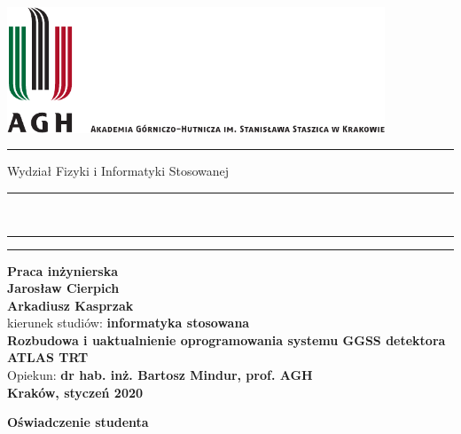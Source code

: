 \documentclass[11pt]{aghdpl}
\author{Jarosław Cierpich \and Arkadiusz Kasprzak}
\date{2019/2020}
\begin{document}

\thispagestyle{empty}

\includegraphics[height=37.5mm]{res/agh_nzw_a_pl_1w_wbr_cmyk.pdf}\\
\rule{30mm}{0pt}
{\Large\textsf{Wydział Fizyki i Informatyki Stosowanej}}\\
\rule{\textwidth}{3pt}\\
\rule[2.75ex]
{\textwidth}{1pt}%
\vspace{1em}\rule{30mm}{0pt}
\begin{center}
    {\bf\LARGE\textsf{Praca inżynierska}}\\
    \vspace{13ex}
    {\bf\Large\textsf{Jarosław Cierpich \\ Arkadiusz Kasprzak}}\\
    \vspace{3ex}
    {\sf \small kierunek studiów:} {\bf\small\textsf{informatyka stosowana}}\\
    \vspace{15ex}
    {\bf\huge\textsf{Rozbudowa i uaktualnienie oprogramowania systemu GGSS detektora ATLAS TRT}}\\
    \vspace{14ex}
    {\sf \Large Opiekun:} {\bf\Large\textsf{dr hab. inż. Bartosz Mindur, prof. AGH}}\\
    \vspace{22ex}
    \textsf{\bf\large\textsf{Kraków, styczeń 2020}}
\end{center}

\newpage

\begin{center}
	{\bf\large\textsf{Oświadczenie studenta}}
\end{center}
\end{document}
